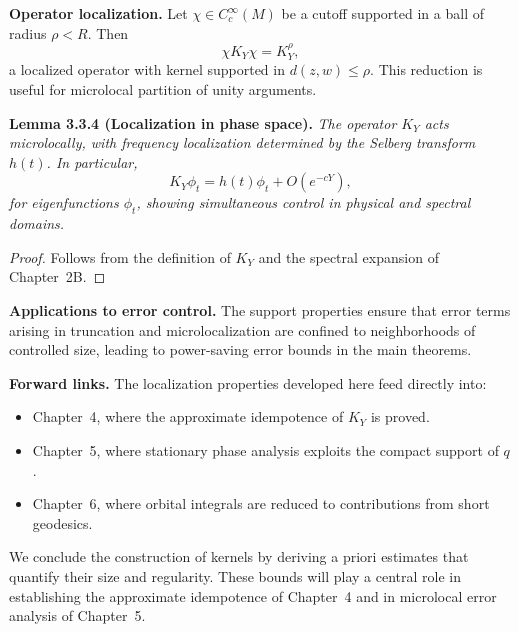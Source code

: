 \medskip

\noindent\textbf{Operator localization.}
Let $\chi\in C_{c}^{\infty}(M)$ be a cutoff supported in a ball of radius $\rho<R$.
Then
\[
  \chi K_{Y}\chi = K_{Y}^{\rho},
\]
a localized operator with kernel supported in $d(z,w)\le \rho$.
This reduction is useful for microlocal partition of unity arguments.

\medskip

\noindent\textbf{Lemma 3.3.4 (Localization in phase space).}
\emph{The operator $K_{Y}$ acts microlocally,
with frequency localization determined by the Selberg transform $h(t)$.
In particular,
\[
  K_{Y}\phi_{t} = h(t)\phi_{t} + O(e^{-cY}),
\]
for eigenfunctions $\phi_{t}$,
showing simultaneous control in physical and spectral domains.}

\begin{proof}
Follows from the definition of $K_{Y}$ and the spectral expansion of Chapter~2B.
\end{proof}

\medskip

\noindent\textbf{Applications to error control.}
The support properties ensure that error terms
arising in truncation and microlocalization
are confined to neighborhoods of controlled size,
leading to power-saving error bounds in the main theorems.

\medskip

\noindent\textbf{Forward links.}
The localization properties developed here
feed directly into:
\begin{itemize}
  \item Chapter~4, where the approximate idempotence of $K_{Y}$ is proved.
  \item Chapter~5, where stationary phase analysis exploits the compact support of $q$.
  \item Chapter~6, where orbital integrals are reduced to contributions from short geodesics.
\end{itemize}

\medskip

\noindent


\noindent
We conclude the construction of kernels by deriving a priori estimates
that quantify their size and regularity.
These bounds will play a central role in establishing the approximate idempotence
of Chapter~4 and in microlocal error analysis of Chapter~5.

